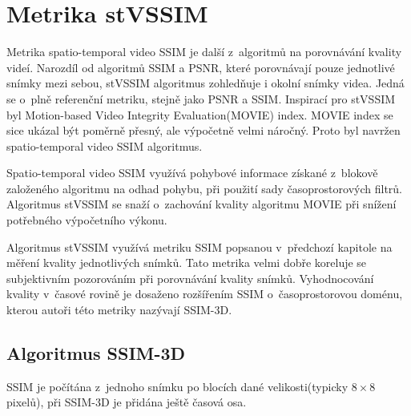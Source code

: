 \documentclass[thesis=M,czech]{FITthesis}[2016/06/26]
\begin{document}
\section{Metrika stVSSIM} \label{STVSSIM}
Metrika spatio-temporal video SSIM\cite{stVSSIM} je další z~algoritmů na porovnávání kvality videí. Narozdíl od algoritmů SSIM a PSNR, které porovnávají pouze jednotlivé snímky mezi sebou, stVSSIM algoritmus zohledňuje i okolní snímky videa. Jedná se o~plně referenční metriku, stejně jako PSNR a SSIM. Inspirací pro stVSSIM byl Motion-based Video Integrity Evaluation(MOVIE) index\cite{MOVIE}. MOVIE index se sice ukázal být poměrně přesný, ale výpočetně velmi náročný. Proto byl navržen spatio-temporal video SSIM algoritmus. 

Spatio-temporal video SSIM využívá pohybové informace získané z~blokově založeného algoritmu na odhad pohybu, při použití sady časoprostorových filtrů. Algoritmus stVSSIM se snaží o~zachování kvality algoritmu MOVIE při snížení potřebného výpočetního výkonu.

Algoritmus stVSSIM využívá metriku SSIM popsanou v~předchozí kapitole na měření kvality jednotlivých snímků. Tato metrika velmi dobře koreluje se subjektivním pozorováním při porovnávání kvality snímků\cite{SSIM3}. Vyhodnocování kvality v~časové rovině je dosaženo rozšířením SSIM o~časoprostorovou doménu, kterou autoři této metriky nazývají SSIM-3D. 

\subsection{Algoritmus SSIM-3D}
SSIM je počítána z~jednoho snímku po blocích dané velikosti(typicky $8\times8$ pixelů), při SSIM-3D je přidána ještě časová osa.
\end{document}
